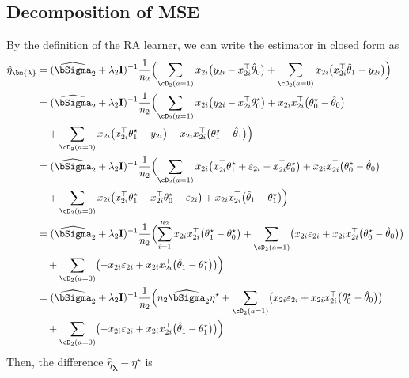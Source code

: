 \documentclass[12pt,a4paper,pdftex,onepage]{article}
\newcommand{\Sighat}{\widehat{{\bSigma}}}
\begin{document}
\subsection{Decomposition of MSE}\label{subsection; MSE decomposition}
\noindent
By the definition of the RA learner, we can write the estimator in closed form as
\begin{align*}
\hat{\eta}_{\bm{\lambda}} 
&= (\Sighat_2 + \lambda_2 \mathbf{I})^{-1} \frac{1}{n_2} \Bigl(\sum_{\cD_2(a=1)}x_{2i} \bigl(y_{2i} - x_{2i}^\top \hat{\theta}_0\bigr) +\sum_{\cD_2(a=0)} x_{2i}\bigl( x_{2i}^\top \hat{\theta}_1 - y_{2i}\bigr)\Bigr)\\
&=(\Sighat_2 + \lambda_2 \mathbf{I})^{-1}  \frac{1}{n_2}\Bigl(\sum_{\cD_2(a=1)} x_{2i}\bigl(y_{2i} - x_{2i}^\top {\theta}^\star_0 \bigr) + x_{2i}x_{2i}^\top\bigl({\theta}^\star_0-\hat{\theta}_0\bigr)\\
&\quad +\sum_{\cD_2(a=0)} x_{2i}\bigl( x_{2i}^\top {\theta}^\star_1 -y_{2i}\bigr) - x_{2i}x_{2i}^\top\bigl({\theta}^\star_1-\hat{\theta}_1\bigr) \Bigr) \\
&= (\Sighat_2 + \lambda_2 \mathbf{I})^{-1}  \frac{1}{n_2}\Bigl(\sum_{\cD_2(a=1)} x_{2i}\bigl(x_{2i}^\top \theta_1^\star + \varepsilon_{2i} - x_{2i}^\top {\theta}^\star_0\bigr) +x_{2i}x_{2i}^\top\bigl({\theta}^\star_0-\hat{\theta}_0\bigr)\\
&\quad+\sum_{\cD_2(a=0)} x_{2i}\bigl( x_{2i}^\top {\theta}^\star_1 -x_{2i}^\top \theta_0^\star - \varepsilon_{2i}\bigr)
+x_{2i}x_{2i}^\top\bigl(\hat{\theta}_1-{\theta}^\star_1\bigr)\Bigr) \\
&= (\Sighat_2 + \lambda_2 \mathbf{I})^{-1}  \frac{1}{n_2}\Bigl(\sum_{i=1}^{n_2}x_{2i}x_{2i}^\top\bigl(\theta_1^\star-\theta_0^\star\bigr) 
+
\sum_{\cD_2(a=1)} \bigl(x_{2i}\varepsilon_{2i} +x_{2i}x_{2i}^\top\bigl({\theta}^\star_0-\hat{\theta}_0\bigr)\bigr) \\
&\quad +\sum_{\cD_2(a=0)}  \bigl(- x_{2i}\varepsilon_{2i}+x_{2i}x_{2i}^\top\bigl(\hat{\theta}_1-{\theta}^\star_1\bigr)\bigr)\Bigr)\\
&= (\Sighat_2 + \lambda_2 \mathbf{I})^{-1} \frac{1}{n_2}\Bigl(n_2 \Sighat_2 \eta^\star + 
\sum_{\cD_2(a=1)} \bigl(x_{2i}\varepsilon_{2i} +x_{2i}x_{2i}^\top\bigl({\theta}^\star_0-\hat{\theta}_0\bigr)\bigr) \\
&\quad +\sum_{\cD_2(a=0)} \bigl(- x_{2i}\varepsilon_{2i}+x_{2i}x_{2i}^\top\bigl(\hat{\theta}_1-{\theta}^\star_1\bigr)\bigr)\Bigr).
\end{align*}
Then, the difference \(\hat{\eta}_{\bm{\lambda}}-\eta^\star\) is
\end{document}
